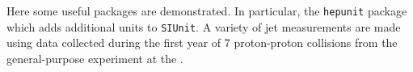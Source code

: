 Here some useful packages are demonstrated.
In particular, the \texttt{hepunit} package which adds additional units to \texttt{SIUnit}.
A variety of jet measurements are made using data collected during the first year of \unit{7}{\TeV} proton-proton collisions from the general-purpose \ATLAS experiment at the \LHC.
